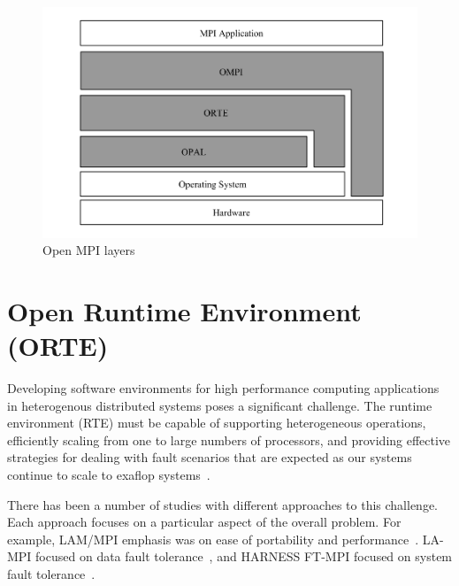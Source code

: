 \begin{figure}[h!]
\centering
\includegraphics[scale=0.5]{images/open-mpi-layers.png}
\caption{Open MPI layers}
\label{fig:open-mpi-layers}
\end{figure}


\section{Open Runtime Environment (ORTE)}
\label{sec:orte}
Developing software environments for high performance computing applications in heterogenous distributed systems poses a significant challenge. The runtime environment (RTE) must be capable of supporting heterogeneous operations, efficiently scaling from one to large numbers of processors, and providing effective strategies for dealing with fault scenarios that are expected as our systems continue to scale to exaflop systems~\cite{kronstadt2005peta}.

There has been a number of studies with different approaches to this challenge. Each approach focuses on a particular aspect of the overall problem. For example, LAM/MPI emphasis was on ease of portability and performance~\cite{squyres2004component}. LA-MPI focused on data fault tolerance~\cite{aulwes2004architecture}, and HARNESS FT-MPI focused on system fault tolerance~\cite{fagg2002harness}.

